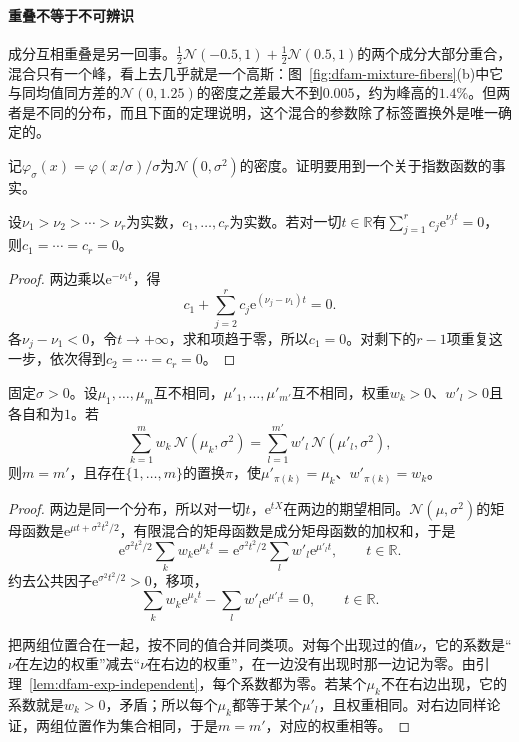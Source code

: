 \paragraph{重叠不等于不可辨识}
成分互相重叠是另一回事。$\tfrac12\mathcal{N}(-0.5,1)+\tfrac12\mathcal{N}(0.5,1)$的两个成分大部分重合，混合只有一个峰，看上去几乎就是一个高斯：图~\ref{fig:dfam-mixture-fibers}(b)中它与同均值同方差的$\mathcal{N}(0,1.25)$的密度之差最大不到$0.005$，约为峰高的$1.4\%$。但两者是不同的分布，而且下面的定理说明，这个混合的参数除了标签置换外是唯一确定的。

记$\varphi_\sigma(x)=\varphi(x/\sigma)/\sigma$为$\mathcal{N}(0,\sigma^{2})$的密度。证明要用到一个关于指数函数的事实。

\begin{lemma}[不同指数的指数函数线性无关]
\label{lem:dfam-exp-independent}
设$\nu_1>\nu_2>\cdots>\nu_r$为实数，$c_1,\dots,c_r$为实数。若对一切$t\in\mathbb{R}$有$\sum_{j=1}^{r}c_j\mathrm{e}^{\nu_jt}=0$，则$c_1=\cdots=c_r=0$。
\end{lemma}

\begin{proof}
两边乘以$\mathrm{e}^{-\nu_1t}$，得
\[
  c_1+\sum_{j=2}^{r}c_j\mathrm{e}^{(\nu_j-\nu_1)t}=0 .
\]
各$\nu_j-\nu_1<0$，令$t\to+\infty$，求和项趋于零，所以$c_1=0$。对剩下的$r-1$项重复这一步，依次得到$c_2=\cdots=c_r=0$。
\end{proof}

\begin{theorem}[已知方差的高斯位置混合可辨识]
\label{thm:dfam-gaussian-mixture-identifiable}
固定$\sigma>0$。设$\mu_1,\dots,\mu_m$互不相同，$\mu'_1,\dots,\mu'_{m'}$互不相同，权重$w_k>0$、$w'_l>0$且各自和为$1$。若
\begin{equation}
  \sum_{k=1}^{m}w_k\,\mathcal{N}(\mu_k,\sigma^{2})=\sum_{l=1}^{m'}w'_l\,\mathcal{N}(\mu'_l,\sigma^{2}),
  \label{eq:dfam-mixture-equal}
\end{equation}
则$m=m'$，且存在$\{1,\dots,m\}$的置换$\pi$，使$\mu'_{\pi(k)}=\mu_k$、$w'_{\pi(k)}=w_k$。
\end{theorem}

\begin{proof}
两边是同一个分布，所以对一切$t$，$\mathrm{e}^{tX}$在两边的期望相同。$\mathcal{N}(\mu,\sigma^{2})$的矩母函数是$\mathrm{e}^{\mu t+\sigma^{2}t^{2}/2}$，有限混合的矩母函数是成分矩母函数的加权和，于是
\[
  \mathrm{e}^{\sigma^{2}t^{2}/2}\sum_{k}w_k\mathrm{e}^{\mu_kt}=\mathrm{e}^{\sigma^{2}t^{2}/2}\sum_{l}w'_l\mathrm{e}^{\mu'_lt},\qquad t\in\mathbb{R}.
\]
约去公共因子$\mathrm{e}^{\sigma^{2}t^{2}/2}>0$，移项，
\[
  \sum_{k}w_k\mathrm{e}^{\mu_kt}-\sum_lw'_l\mathrm{e}^{\mu'_lt}=0,\qquad t\in\mathbb{R}.
\]

把两组位置合在一起，按不同的值合并同类项。对每个出现过的值$\nu$，它的系数是“$\nu$在左边的权重”减去“$\nu$在右边的权重”，在一边没有出现时那一边记为零。由引理~\ref{lem:dfam-exp-independent}，每个系数都为零。若某个$\mu_k$不在右边出现，它的系数就是$w_k>0$，矛盾；所以每个$\mu_k$都等于某个$\mu'_l$，且权重相同。对右边同样论证，两组位置作为集合相同，于是$m=m'$，对应的权重相等。
\end{proof}

